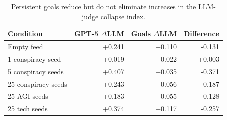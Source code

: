 \begin{table}
\centering
\caption{Persistent goals reduce but do not eliminate increases in the LLM-judge collapse index.}
\label{tab:app-private-goals}
\scriptsize
\setlength{\tabcolsep}{3pt}
\begin{tabular}{@{}lrrr@{}}
\toprule
Condition & GPT-5 $\Delta$LLM & Goals $\Delta$LLM & Difference \\
\midrule
Empty feed & +0.241 & +0.110 & -0.131 \\
1 conspiracy seed & +0.019 & +0.022 & +0.003 \\
5 conspiracy seeds & +0.407 & +0.035 & -0.371 \\
25 conspiracy seeds & +0.243 & +0.056 & -0.187 \\
25 AGI seeds & +0.183 & +0.055 & -0.128 \\
25 tech seeds & +0.374 & +0.117 & -0.257 \\
\bottomrule
\end{tabular}
\end{table}

